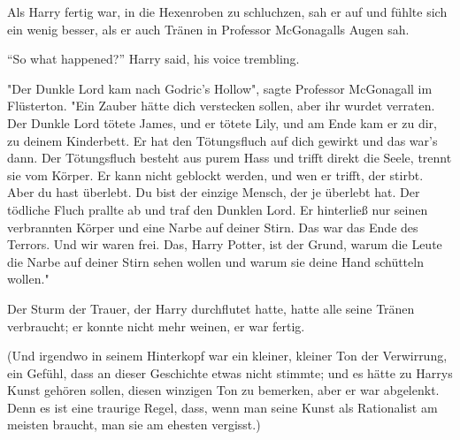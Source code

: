 Als Harry fertig war, in die Hexenroben zu schluchzen, sah er auf und fühlte sich ein wenig besser, als er auch Tränen in Professor McGonagalls Augen sah.

“So what happened?” Harry said, his voice trembling.

"Der Dunkle Lord kam nach Godric's Hollow", sagte Professor McGonagall im Flüsterton. "Ein Zauber hätte dich verstecken sollen, aber ihr wurdet verraten. Der Dunkle Lord tötete James, und er tötete Lily, und am Ende kam er zu dir, zu deinem Kinderbett. Er hat den Tötungsfluch auf dich gewirkt und das war's dann. Der Tötungsfluch besteht aus purem Hass und trifft direkt die Seele, trennt sie vom Körper. Er kann nicht geblockt werden, und wen er trifft, der stirbt. Aber du hast überlebt. Du bist der einzige Mensch, der je überlebt hat. Der tödliche Fluch prallte ab und traf den Dunklen Lord. Er hinterließ nur seinen verbrannten Körper und eine Narbe auf deiner Stirn. Das war das Ende des Terrors. Und wir waren frei. Das, Harry Potter, ist der Grund, warum die Leute die Narbe auf deiner Stirn sehen wollen und warum sie deine Hand schütteln wollen." 

Der Sturm der Trauer, der Harry durchflutet hatte, hatte alle seine Tränen verbraucht; er konnte nicht mehr weinen, er war fertig. 

(Und irgendwo in seinem Hinterkopf war ein kleiner, kleiner Ton der Verwirrung, ein Gefühl, dass an dieser Geschichte etwas nicht stimmte; und es hätte zu Harrys Kunst gehören sollen, diesen winzigen Ton zu bemerken, aber er war abgelenkt. Denn es ist eine traurige Regel, dass, wenn man seine Kunst als Rationalist am meisten braucht, man sie am ehesten vergisst.) 

